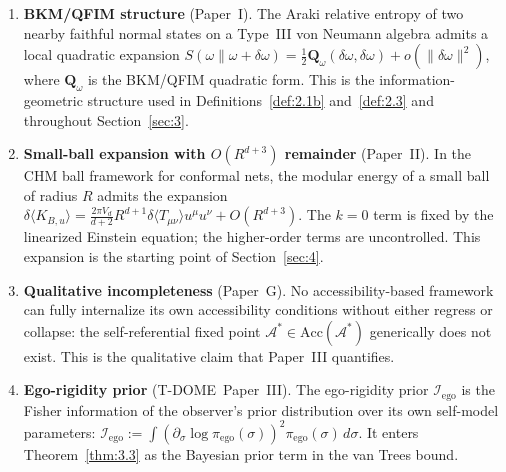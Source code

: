 \documentclass[12pt]{article}
\theoremstyle{definition}
\theoremstyle{remark}
\begin{document}
\begin{enumerate}
\item \textbf{BKM/QFIM structure} (Paper~I\cite{PaperI}).
The Araki relative entropy of two nearby faithful normal states on a
Type~III von Neumann algebra admits a local quadratic expansion
\(S(\omega\|\omega+\delta\omega)=\tfrac{1}{2}\mathbf{Q}_\omega
(\delta\omega,\delta\omega)+o(\|\delta\omega\|^2)\), where
\(\mathbf{Q}_\omega\) is the BKM/QFIM quadratic form. This is the
information-geometric structure used in Definitions~\ref{def:2.1b}
and~\ref{def:2.3} and throughout Section~\ref{sec:3}.

\item \textbf{Small-ball expansion with \(O(R^{d+3})\) remainder}
(Paper~II\cite{PaperII}).
In the CHM ball framework for conformal nets, the modular energy of a
small ball of radius \(R\) admits the expansion
\(\delta\langle K_{B,u}\rangle = \frac{2\pi V_d}{d+2}R^{d+1}
\delta\langle T_{\mu\nu}\rangle u^\mu u^\nu + O(R^{d+3})\).
The \(k=0\) term is fixed by the linearized Einstein equation; the
higher-order terms are uncontrolled. This expansion is the starting
point of Section~\ref{sec:4}.

\item \textbf{Qualitative incompleteness} (Paper~G\cite{PaperG}).
No accessibility-based framework can fully internalize its own
accessibility conditions without either regress or collapse: the
self-referential fixed point
\(\mathcal{A}^*\in\mathrm{Acc}(\mathcal{A}^*)\) generically does not
exist. This is the qualitative claim that Paper~III quantifies.

\item \textbf{Ego-rigidity prior}
(T-DOME~Paper~III\cite{TDOMEIII}).
The ego-rigidity prior \(\mathcal{I}_{\mathrm{ego}}\) is the Fisher
information of the observer's prior distribution over its own
self-model parameters:
\(\mathcal{I}_{\mathrm{ego}}:=\int(\partial_\sigma\log
\pi_{\mathrm{ego}}(\sigma))^2\pi_{\mathrm{ego}}(\sigma)\,d\sigma\).
It enters Theorem~\ref{thm:3.3} as the Bayesian prior term in the van
Trees bound.
\end{enumerate}
 
\newpage
%
\end{document}
